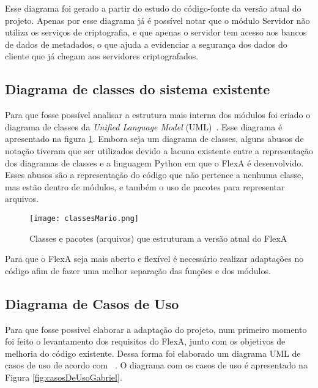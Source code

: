         Esse diagrama foi gerado a partir do estudo do código-fonte da versão atual do projeto. Apenas por esse diagrama já é possível notar que o módulo Servidor não utiliza os serviços de criptografia, e que apenas o servidor tem acesso aos bancos de dados de metadados, o que ajuda a evidenciar a segurança dos dados do cliente que já chegam aos servidores criptografados.
    
    \subsection{Diagrama de classes do sistema existente} 
    
        Para que fosse possível analisar a estrutura mais interna dos módulos foi criado o diagrama de classes da \textit{Unified Language Model} (UML)~\cite{umlClasses}. Esse diagrama é apresentado na figura \ref{fig:classesMario}. Embora seja um diagrama de classes, alguns abusos de notação tiveram que ser utilizados devido a lacuna existente entre a representação dos diagramas de classes e a linguagem Python em que o FlexA é desenvolvido. Esses abusos são a representação do código que não pertence a nenhuma classe, mas estão dentro de módulos, e também o uso de pacotes para representar arquivos.
        
        \begin{figure}[!ht]
        \centering
        \texttt{[image: classesMario.png]}
        \caption{Classes e pacotes (arquivos) que estruturam a versão atual do FlexA}
        \label{fig:classesMario}
        \end{figure}
             
        
        Para que o FlexA seja mais aberto e flexível é necessário realizar adaptações no código afim de fazer uma melhor separação das funções e dos módulos.
        
        \subsection{Diagrama de Casos de Uso}
        
        Para que fosse possivel elaborar a adaptação do projeto, num primeiro momento foi feito o levantamento dos requisitos do FlexA, junto com os objetivos de melhoria do código existente. Dessa forma foi elaborado um diagrama UML de casos de uso de acordo com ~\cite{umlCasosDeUso}. O diagrama com os casos de uso é apresentado na Figura \ref{fig:casosDeUsoGabriel}.
        
